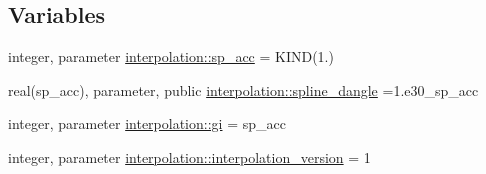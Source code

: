 \subsection*{Variables}
\begin{DoxyCompactItemize}
\item 
integer, parameter \mbox{\hyperlink{namespaceinterpolation_af72aa9a05feb8ef90b2d26e4a013abf3}{interpolation\+::sp\+\_\+acc}} = K\+I\+ND(1.)
\item 
real(sp\+\_\+acc), parameter, public \mbox{\hyperlink{namespaceinterpolation_a3f75fda9aed3d08991097b0d7c8fc70f}{interpolation\+::spline\+\_\+dangle}} =1.e30\+\_\+sp\+\_\+acc
\item 
integer, parameter \mbox{\hyperlink{namespaceinterpolation_a7242dea48715e8170bae81efe12c64be}{interpolation\+::gi}} = sp\+\_\+acc
\item 
integer, parameter \mbox{\hyperlink{namespaceinterpolation_a49ff5214fde353c8438a404922ce5989}{interpolation\+::interpolation\+\_\+version}} = 1
\end{DoxyCompactItemize}
